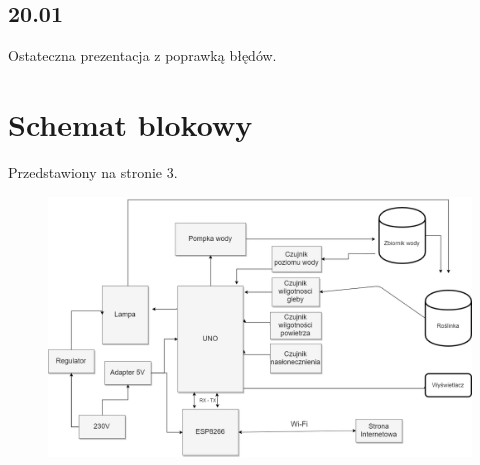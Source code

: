 \documentclass{article}
\begin{document}
\subsection{20.01}
Ostateczna prezentacja z poprawką błędów.


\section{Schemat blokowy}
Przedstawiony na stronie 3.
\begin{figure}
\centering
\includegraphics[scale=0.4]{schemat_blokowy}
\end{figure}
\end{document}
